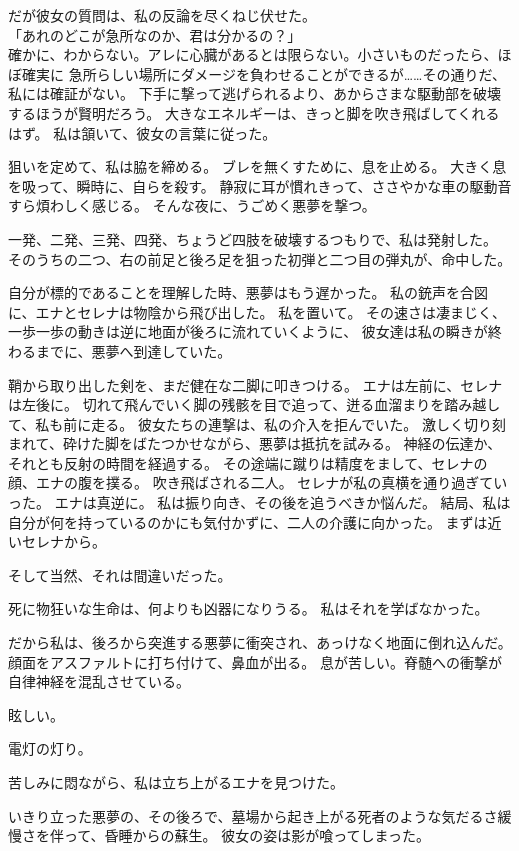 \documentclass[../IHMain]{subfiles}
\begin{document}
だが彼女の質問は、私の反論を尽くねじ伏せた。\\
「あれのどこが急所なのか、君は分かるの？」\\
確かに、わからない。アレに心臓があるとは限らない。小さいものだったら、ほぼ確実に
急所らしい場所にダメージを負わせることができるが……その通りだ、私には確証がない。
下手に撃って逃げられるより、あからさまな駆動部を破壊するほうが賢明だろう。
大きなエネルギーは、きっと脚を吹き飛ばしてくれるはず。
私は頷いて、彼女の言葉に従った。

狙いを定めて、私は脇を締める。
ブレを無くすために、息を止める。
大きく息を吸って、瞬時に、自らを殺す。
静寂に耳が慣れきって、ささやかな車の駆動音すら煩わしく感じる。
そんな夜に、うごめく悪夢を撃つ。

一発、二発、三発、四発、ちょうど四肢を破壊するつもりで、私は発射した。
そのうちの二つ、右の前足と後ろ足を狙った初弾と二つ目の弾丸が、命中した。

自分が標的であることを理解した時、悪夢はもう遅かった。
私の銃声を合図に、エナとセレナは物陰から飛び出した。
私を置いて。
その速さは凄まじく、一歩一歩の動きは逆に地面が後ろに流れていくように、
彼女達は私の瞬きが終わるまでに、悪夢へ到達していた。

鞘から取り出した剣を、まだ健在な二脚に叩きつける。
エナは左前に、セレナは左後に。
切れて飛んでいく脚の残骸を目で追って、迸る血溜まりを踏み越して、私も前に走る。
彼女たちの連撃は、私の介入を拒んでいた。
激しく切り刻まれて、砕けた脚をばたつかせながら、悪夢は抵抗を試みる。
神経の伝達か、それとも反射の時間を経過する。
その途端に蹴りは精度をまして、セレナの顔、エナの腹を撲る。
吹き飛ばされる二人。
セレナが私の真横を通り過ぎていった。
エナは真逆に。
私は振り向き、その後を追うべきか悩んだ。
結局、私は自分が何を持っているのかにも気付かずに、二人の介護に向かった。
まずは近いセレナから。

そして当然、それは間違いだった。

死に物狂いな生命は、何よりも凶器になりうる。
私はそれを学ばなかった。

だから私は、後ろから突進する悪夢に衝突され、あっけなく地面に倒れ込んだ。
顔面をアスファルトに打ち付けて、鼻血が出る。
息が苦しい。脊髄への衝撃が自律神経を混乱させている。

眩しい。

電灯の灯り。

苦しみに悶ながら、私は立ち上がるエナを見つけた。

いきり立った悪夢の、その後ろで、墓場から起き上がる死者のような気だるさ緩慢さを伴って、昏睡からの蘇生。
彼女の姿は影が喰ってしまった。
\end{document}
